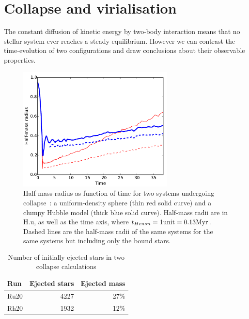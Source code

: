   
\section{Collapse and virialisation}
\label{Sec:Collapse}


The constant diffusion of kinetic energy by two-body interaction means that no stellar system ever reaches a steady equilibrium. However we can contrast the time-evolution of two configurations and draw conclusions about their observable properties. 







\begin{figure}
\begin{center}
\includegraphics[width=0.7\textwidth]{Figures/3_Rhm_global}
\caption{Half-mass radius as function of time for two systems undergoing collapse~: a uniform-density sphere (thin red solid curve) and a clumpy Hubble model (thick blue solid curve). Half-mass radii are in H.u, as well as the time axis, where $t_{Henon} = 1 {\rm unit} =  0.13 {\textrm{Myr}}$. Dashed lines are the half-mass radii of the same systems for the same systems but including only the bound stars.}
\label{Fig:3_Rhm_global}
\end{center}
\end{figure}

\begin{table}
\begin{center}
\caption{Number of initially ejected stars in two collapse calculations} \label{tab:Ejectedstars}
\begin{tabular}{lrr}
Run & Ejected stars & Ejected mass  \\
\hline
Ru20  &  4227 & 27\% \\
Rh20  &  1932 & 12\% \\
\hline
\end{tabular}
\end{center}
\end{table}




